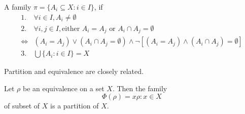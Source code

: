 \begin{Def}[Partition of $X$]
    A family $\pi=\{A_i \subseteq X:i\in I\}$, if
    \begin{align*}
        1. &\forall i\in I, A_i \neq \emptyset \\
        2. &\forall i,j \in I, \text{either } A_i = A_j \text{ or } A_i \cap A_j = \emptyset \\
        \Leftrightarrow &(A_i=A_j) \vee (A_i \cap A_j = \emptyset)\wedge \lnot [(A_i = A_j) \wedge (A_i \cap A_j) = \emptyset]  \\
        3. &\bigcup\{A_i: i\in I\}=X
    \end{align*}
\end{Def}

\begin{Prop}\label{Prop:1.4.6}
    Partition and equivalence are closely related.

    Let $\rho $ be an equivalence on a set $X$. Then the family 
    \[\Phi(\rho )={x\rho : x\in X} \]
    of subset of $X$ is a partition of $X$.


\end{Prop}
